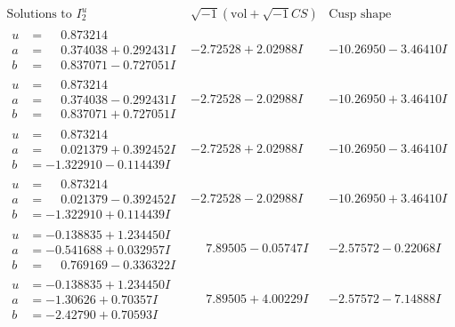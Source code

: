 \documentclass[1p]{elsarticle_modified}
\theoremstyle{definition}
\newcommand{\I}{\sqrt{-1}}
\begin{document}
$$\begin{array}{c|c|c}  
\text{Solutions to }I^u_{2}& \I (\text{vol} + \sqrt{-1}CS) & \text{Cusp shape}\\
 \hline 
\begin{aligned}
u &= \phantom{-}0.873214\phantom{ +0.000000I} \\
a &= \phantom{-}0.374038 + 0.292431 I \\
b &= \phantom{-}0.837071 - 0.727051 I\end{aligned}
 & -2.72528 + 2.02988 I & -10.26950 - 3.46410 I \\ \hline\begin{aligned}
u &= \phantom{-}0.873214\phantom{ +0.000000I} \\
a &= \phantom{-}0.374038 - 0.292431 I \\
b &= \phantom{-}0.837071 + 0.727051 I\end{aligned}
 & -2.72528 - 2.02988 I & -10.26950 + 3.46410 I \\ \hline\begin{aligned}
u &= \phantom{-}0.873214\phantom{ +0.000000I} \\
a &= \phantom{-}0.021379 + 0.392452 I \\
b &= -1.322910 - 0.114439 I\end{aligned}
 & -2.72528 + 2.02988 I & -10.26950 - 3.46410 I \\ \hline\begin{aligned}
u &= \phantom{-}0.873214\phantom{ +0.000000I} \\
a &= \phantom{-}0.021379 - 0.392452 I \\
b &= -1.322910 + 0.114439 I\end{aligned}
 & -2.72528 - 2.02988 I & -10.26950 + 3.46410 I \\ \hline\begin{aligned}
u &= -0.138835 + 1.234450 I \\
a &= -0.541688 + 0.032957 I \\
b &= \phantom{-}0.769169 - 0.336322 I\end{aligned}
 & \phantom{-}7.89505 - 0.05747 I & -2.57572 - 0.22068 I \\ \hline\begin{aligned}
u &= -0.138835 + 1.234450 I \\
a &= -1.30626 + 0.70357 I \\
b &= -2.42790 + 0.70593 I\end{aligned}
 & \phantom{-}7.89505 + 4.00229 I & -2.57572 - 7.14888 I \\ \hline\begin{aligned}

\end{aligned}
\end{array}$$
\end{document}
